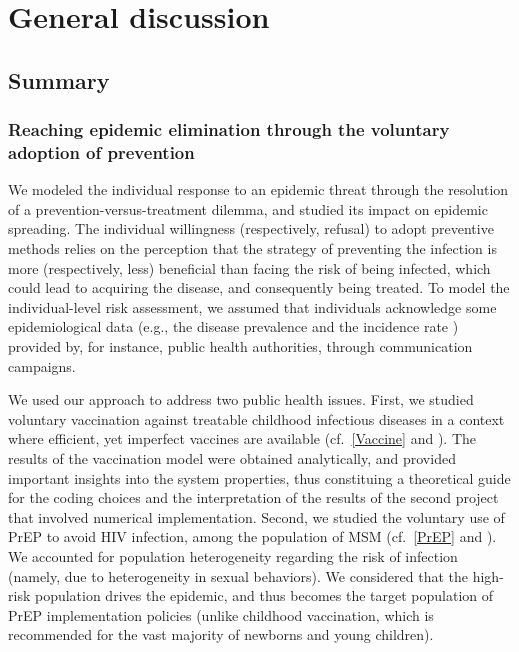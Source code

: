 %
\chapter{General discussion}
\label{Discussion}

\section{Summary}

\subsection{Reaching epidemic elimination through the voluntary adoption of prevention}

We modeled the individual response to an epidemic threat through the resolution of a prevention-versus-treatment dilemma, and studied its impact on epidemic spreading. The individual willingness (respectively, refusal) to adopt preventive methods relies on the perception that the strategy of preventing the infection is more (respectively, less) beneficial than facing the risk of being infected, which could lead to acquiring the disease, and consequently being treated. To model the individual-level risk assessment, we assumed that individuals acknowledge some epidemiological data (e.g., the disease prevalence \cite[]{Jijon2017} and the incidence rate \cite[]{Jijon2021}) provided by, for instance, public health authorities, through communication campaigns. 

We used our approach to address two public health issues. First, we studied voluntary vaccination against treatable childhood infectious diseases in a context where efficient, yet imperfect vaccines are available (cf.~\autoref{Vaccine} and \cite[]{Jijon2017}). The results of the vaccination model were obtained analytically, and provided important insights into the system properties, thus constituing a theoretical guide for the coding choices and the interpretation of the results of the second project that involved numerical implementation. Second, we studied the voluntary use of PrEP to avoid HIV infection, among the population of MSM (cf.~\autoref{PrEP} and \cite[]{Jijon2021}). We accounted for population heterogeneity regarding the risk of infection (namely, due to heterogeneity in sexual behaviors). We considered that the high-risk population drives the epidemic, and thus becomes the target population of PrEP implementation policies (unlike childhood vaccination, which is recommended for the vast majority of newborns and young children). 

